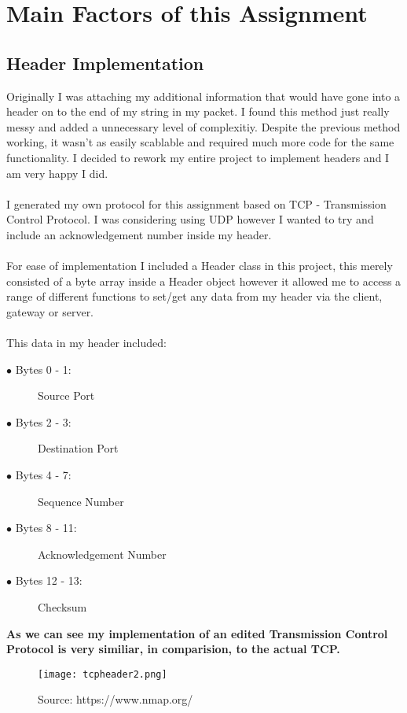 \documentclass[10pt]{article}
\begin{document}
\section{Main Factors of this Assignment}
\subsection{Header Implementation}
Originally I was attaching my additional information that would have gone into a header on to the end of my string in my packet. I found this method just really messy and added a unnecessary level of complexitiy. Despite the previous method working, it wasn't as easily scablable and required much more code for the same functionality. I decided to rework my entire project to implement headers and I am very happy I did.\\\\I generated my own protocol for this assignment based on TCP - Transmission Control Protocol. I was considering using UDP however I wanted to try and include an acknowledgement number inside my header.
\\\\
For ease of implementation I included a Header class in this project, this merely consisted of a byte array inside a Header object however it allowed me to access a range of different functions to set/get any data from my header via the client, gateway or server.\\\\This data in my header included:
		\begin{description}
\item[$\bullet$ Bytes 0 - 1:] Source Port
\item[$\bullet$ Bytes 2 - 3:] Destination Port
\item[$\bullet$ Bytes 4 - 7:] Sequence Number
\item[$\bullet$ Bytes 8 - 11:] Acknowledgement Number
\item[$\bullet$ Bytes 12 - 13:] Checksum
\end{description}
\textbf{As we can see my implementation of an edited Transmission Control Protocol is very similiar, in comparision, to the actual TCP.}
		\begin{figure}[h!]
	\texttt{[image: tcpheader2.png]}
	\caption{Source: https://www.nmap.org/}
	\label{fig:tcpheader}
\end{figure}\newpage
\end{document}
